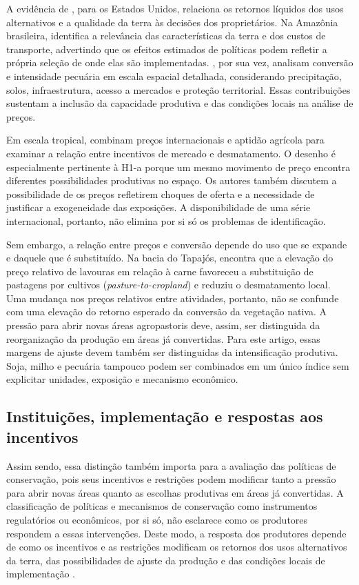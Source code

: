 A evidência de , para os Estados Unidos, relaciona os retornos líquidos dos usos alternativos e a qualidade da terra às decisões dos proprietários. Na Amazônia brasileira,  identifica a relevância das características da terra e dos custos de transporte, advertindo que os efeitos estimados de políticas podem refletir a própria seleção de onde elas são implementadas. , por sua vez, analisam conversão e intensidade pecuária em escala espacial detalhada, considerando precipitação, solos, infraestrutura, acesso a mercados e proteção territorial. Essas contribuições sustentam a inclusão da capacidade produtiva e das condições locais na análise de preços.

Em escala tropical,  combinam preços internacionais e aptidão agrícola para examinar a relação entre incentivos de mercado e desmatamento. O desenho é especialmente pertinente à H1-a porque um mesmo movimento de preço encontra diferentes possibilidades produtivas no espaço. Os autores também discutem a possibilidade de os preços refletirem choques de oferta e a necessidade de justificar a exogeneidade das exposições. A disponibilidade de uma série internacional, portanto, não elimina por si só os problemas de identificação.

Sem embargo, a relação entre preços e conversão depende do uso que se expande e daquele que é substituído. Na bacia do Tapajós,  encontra que a elevação do preço relativo de lavouras em relação à carne favoreceu a substituição de pastagens por cultivos (\textit{pasture-to-cropland}) e reduziu o desmatamento local. Uma mudança nos preços relativos entre atividades, portanto, não se confunde com uma elevação do retorno esperado da conversão da vegetação nativa. A pressão para abrir novas áreas agropastoris deve, assim, ser distinguida da reorganização da produção em áreas já convertidas. Para este artigo, essas margens de ajuste devem também ser distinguidas da intensificação produtiva. Soja, milho e pecuária tampouco podem ser combinados em um único índice sem explicitar unidades, exposição e mecanismo econômico.

\subsection{Instituições, implementação e respostas aos incentivos}

Assim sendo, essa distinção também importa para a avaliação das políticas de conservação, pois seus incentivos e restrições podem modificar tanto a pressão para abrir novas áreas quanto as escolhas produtivas em áreas já convertidas. A classificação de políticas e mecanismos de conservação como instrumentos regulatórios ou econômicos, por si só, não esclarece como os produtores respondem a essas intervenções. Deste modo, a resposta dos produtores depende de como os incentivos e as restrições modificam os retornos dos usos alternativos da terra, das possibilidades de ajuste da produção e das condições locais de implementação \cite{Angelsen2010}.

